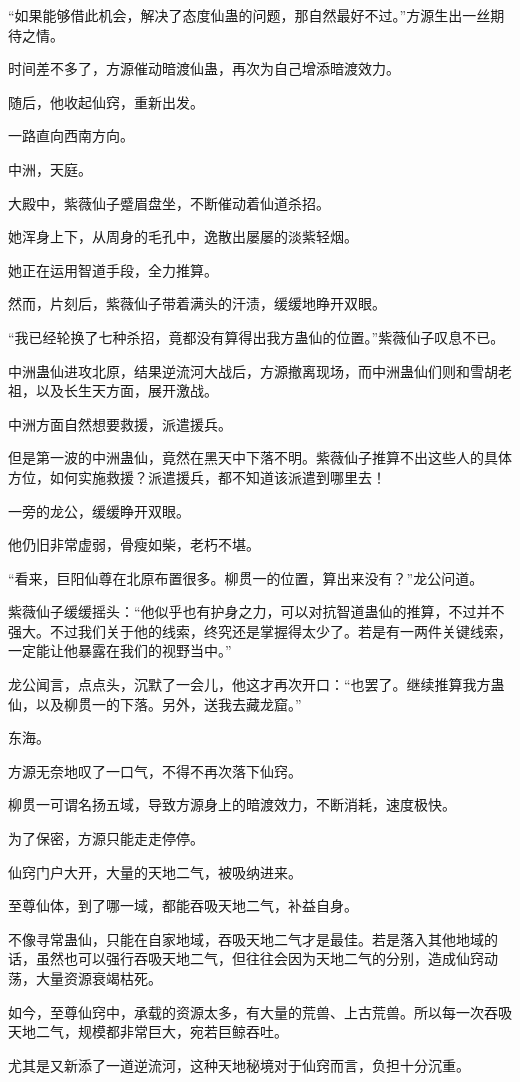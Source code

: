 \begin{this_body}
“如果能够借此机会，解决了态度仙蛊的问题，那自然最好不过。”方源生出一丝期待之情。

时间差不多了，方源催动暗渡仙蛊，再次为自己增添暗渡效力。

随后，他收起仙窍，重新出发。

一路直向西南方向。

中洲，天庭。

大殿中，紫薇仙子蹙眉盘坐，不断催动着仙道杀招。

她浑身上下，从周身的毛孔中，逸散出屡屡的淡紫轻烟。

她正在运用智道手段，全力推算。

然而，片刻后，紫薇仙子带着满头的汗渍，缓缓地睁开双眼。

“我已经轮换了七种杀招，竟都没有算得出我方蛊仙的位置。”紫薇仙子叹息不已。

中洲蛊仙进攻北原，结果逆流河大战后，方源撤离现场，而中洲蛊仙们则和雪胡老祖，以及长生天方面，展开激战。

中洲方面自然想要救援，派遣援兵。

但是第一波的中洲蛊仙，竟然在黑天中下落不明。紫薇仙子推算不出这些人的具体方位，如何实施救援？派遣援兵，都不知道该派遣到哪里去！

一旁的龙公，缓缓睁开双眼。

他仍旧非常虚弱，骨瘦如柴，老朽不堪。

“看来，巨阳仙尊在北原布置很多。柳贯一的位置，算出来没有？”龙公问道。

紫薇仙子缓缓摇头：“他似乎也有护身之力，可以对抗智道蛊仙的推算，不过并不强大。不过我们关于他的线索，终究还是掌握得太少了。若是有一两件关键线索，一定能让他暴露在我们的视野当中。”

龙公闻言，点点头，沉默了一会儿，他这才再次开口：“也罢了。继续推算我方蛊仙，以及柳贯一的下落。另外，送我去藏龙窟。”

东海。

方源无奈地叹了一口气，不得不再次落下仙窍。

柳贯一可谓名扬五域，导致方源身上的暗渡效力，不断消耗，速度极快。

为了保密，方源只能走走停停。

仙窍门户大开，大量的天地二气，被吸纳进来。

至尊仙体，到了哪一域，都能吞吸天地二气，补益自身。

不像寻常蛊仙，只能在自家地域，吞吸天地二气才是最佳。若是落入其他地域的话，虽然也可以强行吞吸天地二气，但往往会因为天地二气的分别，造成仙窍动荡，大量资源衰竭枯死。

如今，至尊仙窍中，承载的资源太多，有大量的荒兽、上古荒兽。所以每一次吞吸天地二气，规模都非常巨大，宛若巨鲸吞吐。

尤其是又新添了一道逆流河，这种天地秘境对于仙窍而言，负担十分沉重。

\end{this_body}

